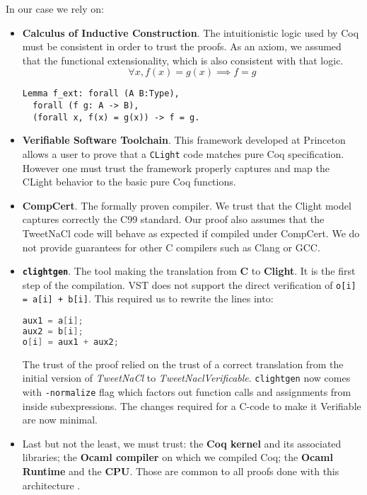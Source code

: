In our case we rely on:
\begin{itemize}
  \item \textbf{Calculus of Inductive Construction}. The intuitionistic logic
  used by Coq must be consistent in order to trust the proofs. As an axiom,
  we assumed that the functional extensionality, which is also consistent with that logic.
  $$\forall x, f(x) = g(x) \implies f = g$$
\begin{lstlisting}[language=Coq]
Lemma f_ext: forall (A B:Type),
  forall (f g: A -> B),
  (forall x, f(x) = g(x)) -> f = g.
\end{lstlisting}

  \item \textbf{Verifiable Software Toolchain}. This framework developed at
  Princeton allows a user to prove that a \texttt{CLight} code matches pure Coq
  specification. However one must trust the framework properly captures and
  map the CLight behavior to the basic pure Coq functions.

  \item \textbf{CompCert}. The formally proven compiler. We trust that the Clight
  model captures correctly the C99 standard.
  Our proof also assumes that the TweetNaCl code will behave as expected if
  compiled under CompCert. We do not provide guarantees for other C compilers
  such as Clang or GCC.

  \item \textbf{\texttt{clightgen}}. The tool making the translation from \textbf{C} to
  \textbf{Clight}. It is the first step of the compilation.
  VST does not support the direct verification of \texttt{o[i] = a[i] + b[i]}.
  This required us to rewrite the lines into:
\begin{lstlisting}[language=C]
aux1 = a[i];
aux2 = b[i];
o[i] = aux1 + aux2;
\end{lstlisting}
  The trust of the proof relied on the trust of a correct translation from the
  initial version of \textit{TweetNaCl} to \textit{TweetNaclVerificable}.
  \texttt{clightgen} now comes with \texttt{-normalize} flag which
  factors out function calls and assignments from inside subexpressions.
  The changes required for a C-code to make it Verifiable are now minimal.

  \item Last but not the least, we must trust: the \textbf{Coq kernel} and its
  associated libraries; the \textbf{Ocaml compiler} on which we compiled Coq;
  the \textbf{Ocaml Runtime} and the \textbf{CPU}. Those are common to all proofs
  done with this architecture \cite{2015-Appel,coq-faq}.
\end{itemize}

